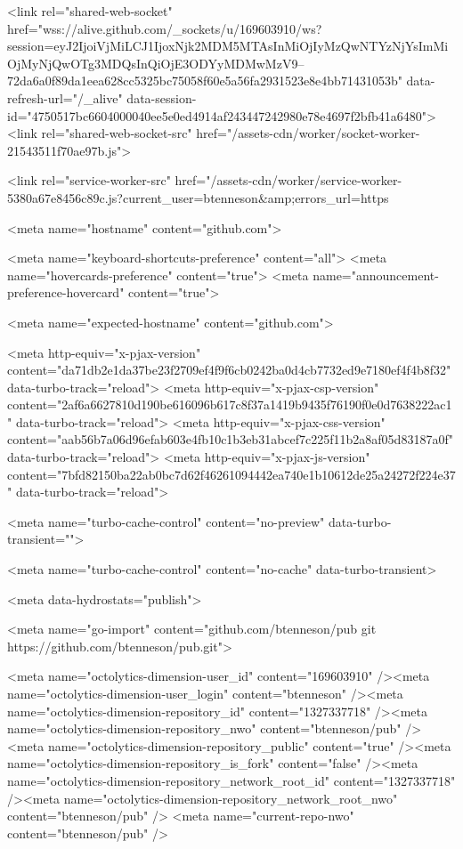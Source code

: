       <link rel="shared-web-socket" href="wss://alive.github.com/_sockets/u/169603910/ws?session=eyJ2IjoiVjMiLCJ1IjoxNjk2MDM5MTAsInMiOjIyMzQwNTYzNjYsImMiOjMyNjQwOTg3MDQsInQiOjE3ODYyMDMwMzV9--72da6a0f89da1eea628cc5325bc75058f60e5a56fa2931523e8e4bb71431053b" data-refresh-url="/_alive" data-session-id="4750517bc6604000040ee5e0ed4914af243447242980e78e4697f2bfb41a6480">
      <link rel="shared-web-socket-src" href="/assets-cdn/worker/socket-worker-21543511f70ae97b.js">

      <link rel="service-worker-src" href="/assets-cdn/worker/service-worker-5380a67e8456c89c.js?current_user=btenneson&amp;errors_url=https%

      <meta name="hostname" content="github.com">


      <meta name="keyboard-shortcuts-preference" content="all">
      <meta name="hovercards-preference" content="true">
      <meta name="announcement-preference-hovercard" content="true">

        <meta name="expected-hostname" content="github.com">


  <meta http-equiv="x-pjax-version" content="da71db2e1da37be23f2709ef4f9f6cb0242ba0d4cb7732ed9e7180ef4f4b8f32" data-turbo-track="reload">
  <meta http-equiv="x-pjax-csp-version" content="2af6a6627810d190be616096b617c8f37a1419b9435f76190f0e0d7638222ac1" data-turbo-track="reload">
  <meta http-equiv="x-pjax-css-version" content="aab56b7a06d96efab603e4fb10c1b3eb31abcef7c225f11b2a8af05d83187a0f" data-turbo-track="reload">
  <meta http-equiv="x-pjax-js-version" content="7bfd82150ba22ab0bc7d62f46261094442ea740e1b10612de25a24272f224e37" data-turbo-track="reload">

  <meta name="turbo-cache-control" content="no-preview" data-turbo-transient="">

      <meta name="turbo-cache-control" content="no-cache" data-turbo-transient>

    <meta data-hydrostats="publish">

  <meta name="go-import" content="github.com/btenneson/pub git https://github.com/btenneson/pub.git">

  <meta name="octolytics-dimension-user_id" content="169603910" /><meta name="octolytics-dimension-user_login" content="btenneson" /><meta name="octolytics-dimension-repository_id" content="1327337718" /><meta name="octolytics-dimension-repository_nwo" content="btenneson/pub" /><meta name="octolytics-dimension-repository_public" content="true" /><meta name="octolytics-dimension-repository_is_fork" content="false" /><meta name="octolytics-dimension-repository_network_root_id" content="1327337718" /><meta name="octolytics-dimension-repository_network_root_nwo" content="btenneson/pub" />
  <meta name="current-repo-nwo" content="btenneson/pub" />



